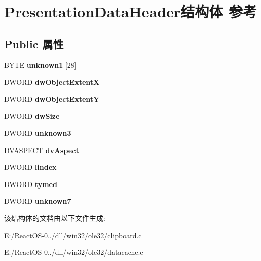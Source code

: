 \hypertarget{struct_presentation_data_header}{}\section{Presentation\+Data\+Header结构体 参考}
\label{struct_presentation_data_header}
\subsection*{Public 属性}
\begin{DoxyCompactItemize}
\item 
\mbox{\label{struct_presentation_data_header_af3573b902f1c160b71b1292f12bf6883}} 
B\+Y\+TE {\bfseries unknown1} \mbox{[}28\mbox{]}
\item 
\mbox{\label{struct_presentation_data_header_a5c7a68c0d84c9c54534082f4e2192709}} 
D\+W\+O\+RD {\bfseries dw\+Object\+ExtentX}
\item 
\mbox{\label{struct_presentation_data_header_a517ac08e279af0460ebf2149ea83dd23}} 
D\+W\+O\+RD {\bfseries dw\+Object\+ExtentY}
\item 
\mbox{\label{struct_presentation_data_header_a350eeda549347bae0cd1be726bfa4eb8}} 
D\+W\+O\+RD {\bfseries dw\+Size}
\item 
\mbox{\label{struct_presentation_data_header_a0fe412a8905254c96ade74d0d49c3ea0}} 
D\+W\+O\+RD {\bfseries unknown3}
\item 
\mbox{\label{struct_presentation_data_header_a8536666d74bf3e8db16c13ba893ae2db}} 
D\+V\+A\+S\+P\+E\+CT {\bfseries dv\+Aspect}
\item 
\mbox{\label{struct_presentation_data_header_affd6b306526eb3aaeb994e4a65d0a4f3}} 
D\+W\+O\+RD {\bfseries lindex}
\item 
\mbox{\label{struct_presentation_data_header_a69d6e07f2f5016708f65afc3b9fc66db}} 
D\+W\+O\+RD {\bfseries tymed}
\item 
\mbox{\label{struct_presentation_data_header_a4cb17838fa5fdef40b370e67520b9fe6}} 
D\+W\+O\+RD {\bfseries unknown7}
\end{DoxyCompactItemize}


该结构体的文档由以下文件生成\+:\begin{DoxyCompactItemize}
\item 
E\+:/\+React\+O\+S-\/0../dll/win32/ole32/clipboard.\+c\item 
E\+:/\+React\+O\+S-\/0../dll/win32/ole32/datacache.\+c\end{DoxyCompactItemize}
